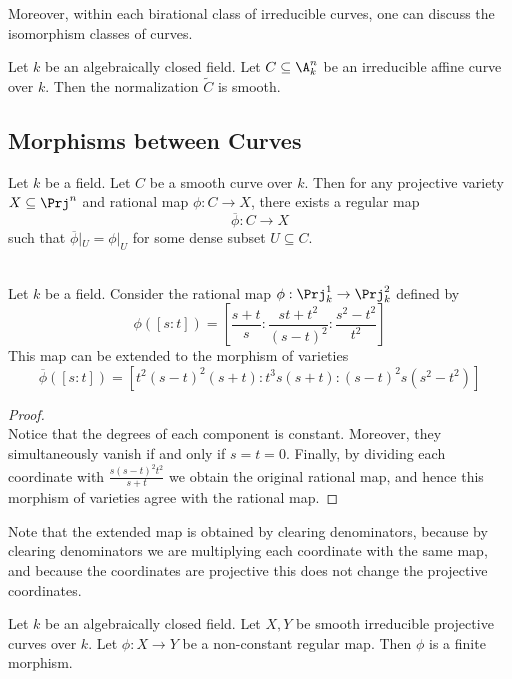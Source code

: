 \documentclass[a4paper]{article}
\begin{document}
Moreover, within each birational class of irreducible curves, one can discuss the isomorphism classes of curves. 

\begin{crl}{}{} Let $k$ be an algebraically closed field. Let $C\subseteq\A_k^n$ be an irreducible affine curve over $k$. Then the normalization $\widetilde{C}$ is smooth. 
\end{crl}

\subsection{Morphisms between Curves}
\begin{prp}{}{} Let $k$ be a field. Let $C$ be a smooth curve over $k$. Then for any projective variety $X\subseteq\Prj^n$ and rational map $\phi:C\to X$, there exists a regular map $$\overline{\phi}:C\to X$$ such that $\overline{\phi}|_U=\phi|_U$ for some dense subset $U\subseteq C$. 
\end{prp}

\begin{eg}{}{}\\
Let $k$ be a field. Consider the rational map $\phi:\Prj_k^1\to\Prj_k^2$ defined by $$\phi([s:t])=\left[\frac{s+t}{s}:\frac{st+t^2}{(s-t)^2}:\frac{s^2-t^2}{t^2}\right]$$ This map can be extended to the morphism of varieties $$\overline{\phi}([s:t])=[t^2(s-t)^2(s+t):t^3s(s+t):(s-t)^2s(s^2-t^2)]$$
\begin{proof}\\
Notice that the degrees of each component is constant. Moreover, they simultaneously vanish if and only if $s=t=0$. Finally, by dividing each coordinate with $\frac{s(s-t)^2t^2}{s+t}$ we obtain the original rational map, and hence this morphism of varieties agree with the rational map. 
\end{proof}
\end{eg}

Note that the extended map is obtained by clearing denominators, because by clearing denominators we are multiplying each coordinate with the same map, and because the coordinates are projective this does not change the projective coordinates. 

\begin{prp}{}{} Let $k$ be an algebraically closed field. Let $X,Y$ be smooth irreducible projective curves over $k$. Let $\phi:X\to Y$ be a non-constant regular map. Then $\phi$ is a finite morphism. 
\end{prp}
\end{document}
